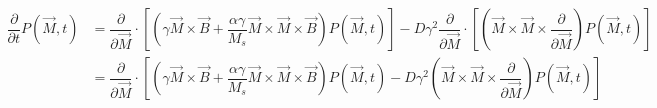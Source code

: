 \documentclass[aps,prb,onecolumn,notitlepage,showpacs,floatfix,superscriptaddress]{revtex4-1}
\begin{document}
\begin{equation}
\begin{split}
\dfrac{\partial}{\partial t} P(\vec{M},t) &= \dfrac{\partial}{\partial \vec{M}} \cdot \left[\left(\gamma \vec{M} \times \vec{B} +\dfrac{\alpha \gamma}{M_s} \vec{M} \times \vec{M} \times \vec{B}\right) P(\vec{M},t) \right]  - D \gamma^2 \dfrac{\partial}{\partial \vec{M}} \cdot \left[\left(\vec{M} \times \vec{M} \times \dfrac{\partial}{\partial \vec{M}} \right) P(\vec{M},t)  \right] \\
 &= \dfrac{\partial}{\partial \vec{M}} \cdot \left[\left(\gamma \vec{M} \times \vec{B} +\dfrac{\alpha \gamma}{M_s} \vec{M} \times \vec{M} \times \vec{B}\right) P(\vec{M},t) - D \gamma^2 \left(\vec{M} \times \vec{M} \times \dfrac{\partial}{\partial \vec{M}} \right) P(\vec{M},t) \right]  
 \end{split}
\end{equation}
%
\end{document}
